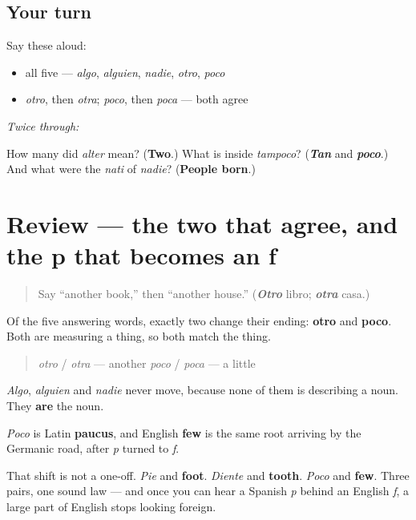 \subsection*{Your turn}
Say these aloud:

\begin{itemize}
\raggedright
  \item all five — \emph{algo}, \emph{alguien}, \emph{nadie}, \emph{otro}, \emph{poco}
  \item \emph{otro}, then \emph{otra}; \emph{poco}, then \emph{poca} — both agree
\end{itemize}

\emph{Twice through:}

\begin{tcolorbox}[breakable,colback=teal!4,colframe=teal!35!black,title={Before you move on}]
How many did \emph{alter} mean? (\textbf{Two}.) What is inside \emph{tampoco}? (\emph{\textbf{Tan}} and \emph{\textbf{poco}}.) And what were the \emph{nati} of \emph{nadie}? (\textbf{People born}.)
\end{tcolorbox}
\section[(review)]{Review — the two that agree, and the p that becomes an f}

\label{lesson:ES-C319-otro-y-poco}



\begin{quote}
Say \textquotedblleft{}another book,\textquotedblright{} then \textquotedblleft{}another house.\textquotedblright{} (\emph{\textbf{Otro}} libro; \emph{\textbf{otra}} casa.)
\end{quote}

\begin{grammarlens}[title={What you've built}]
Of the five answering words, exactly two change their ending: \textbf{otro} and \textbf{poco}. Both are measuring a thing, so both match the thing.

\begin{quote}
\emph{otro} / \emph{otra} — another \emph{poco} / \emph{poca} — a little
\end{quote}

\emph{Algo}, \emph{alguien} and \emph{nadie} never move, because none of them is describing a noun. They \textbf{are} the noun.
\end{grammarlens}

\begin{culture}
\emph{Poco} is Latin \textbf{paucus}, and English \textbf{few} is the same root arriving by the Germanic road, after \emph{p} turned to \emph{f}.

That shift is not a one-off. \emph{Pie} and \textbf{foot}. \emph{Diente} and \textbf{tooth}. \emph{Poco} and \textbf{few}. Three pairs, one sound law — and once you can hear a Spanish \emph{p} behind an English \emph{f}, a large part of English stops looking foreign.
\end{culture}

